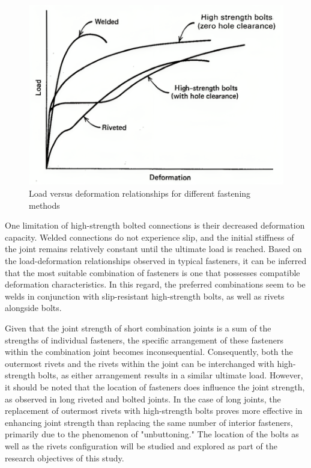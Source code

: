 \begin{figure}
    \centering
    \includegraphics[width=0.75\linewidth]{imgs//ch2/hsbrive-1969.png}
    \caption{Load versus deformation relationships for different fastening methods \cite{steinhardt1969-hybrid}}
    \label{fig-hsbriv-stei}
\end{figure}


One limitation of high-strength bolted connections is their decreased deformation capacity. Welded connections do not experience slip, and the initial stiffness of the joint remains relatively constant until the ultimate load is reached. Based on the load-deformation relationships observed in typical fasteners, it can be inferred that the most suitable combination of fasteners is one that possesses compatible deformation characteristics. In this regard, the preferred combinations seem to be welds in conjunction with slip-resistant high-strength bolts, as well as rivets alongside bolts.

Given that the joint strength of short combination joints is a sum of the strengths of individual fasteners, the specific arrangement of these fasteners within the combination joint becomes inconsequential. Consequently, both the outermost rivets and the rivets within the joint can be interchanged with high-strength bolts, as either arrangement results in a similar ultimate load. However, it should be noted that the location of fasteners does influence the joint strength, as observed in long riveted and bolted joints. In the case of long joints, the replacement of outermost rivets with high-strength bolts proves more effective in enhancing joint strength than replacing the same number of interior fasteners, primarily due to the phenomenon of "unbuttoning." The location of the bolts as well as the rivets configuration will be studied and explored as part of the research objectives of this study.

